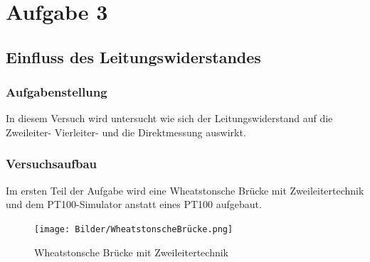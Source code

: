 \documentclass[a4paper,11pt,oneside]{article}
\begin{document}
\section{Aufgabe 3}
\subsection{Einfluss des Leitungswiderstandes}
\subsubsection{Aufgabenstellung}
In diesem Versuch wird untersucht wie sich der Leitungswiderstand auf die Zweileiter- Vierleiter- und die Direktmessung auswirkt.
\subsubsection{Versuchsaufbau}
Im ersten Teil der Aufgabe wird eine Wheatstonsche Brücke mit Zweileitertechnik und dem PT100-Simulator anstatt eines PT100 aufgebaut.
\begin{center}
\begin{figure}[h]
\centering
\texttt{[image: Bilder/WheatstonscheBrücke.png]}
\caption{Wheatstonsche  Brücke mit Zweileitertechnik}
\end{figure}
\end{center}
\end{document}

